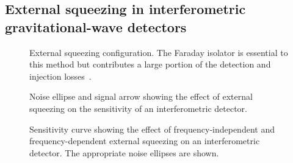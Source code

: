 \subsection{External squeezing in interferometric gravitational-wave detectors}

\begin{figure}
	\centering
	\caption{External squeezing configuration. The Faraday isolator is essential to this method but contributes a large portion of the detection and injection losses~\cite{}.}
	\label{fig:extSqz_config}
\end{figure}

\begin{figure}
	\centering
	\caption{Noise ellipse and signal arrow showing the effect of external squeezing on the sensitivity of an interferometric detector.}
	\label{fig:extSqz_ellipse_arrow}
\end{figure}

\begin{figure}
	\centering
	\caption{Sensitivity curve showing the effect of frequency-independent and frequency-dependent external squeezing on an interferometric detector. The appropriate noise ellipses are shown.}
	\label{fig:extSqz_sensitivity}
\end{figure}


